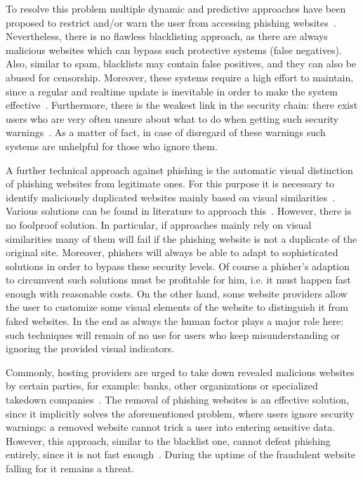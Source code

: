 \begin{description}[leftmargin=0cm]
 To resolve this problem multiple dynamic and predictive approaches have been proposed to restrict and/or warn the user from accessing phishing websites~\cite{prakash2010phishnet, obied2009fraudulent, balzarotti2012proactive}. Nevertheless, there is no flawless blacklisting approach, as there are always malicious websites which can bypass such protective systems (false negatives). Also, similar to spam, blacklists may contain false positives, and they can also be abused for censorship.
 Moreover, these systems require a high effort to maintain, since a regular and realtime update is inevitable in order to make the system effective~\cite{purkait2012phishing}. Furthermore, there is the weakest link in the security chain: there exist users who are very often unsure about what to do when getting such security warnings~\cite{bakhshi2009social}. As a matter of fact, in case of disregard of these warnings such systems are unhelpful for those who ignore them. 
	\item[Visual distinction] A further technical approach against phishing is the automatic visual distinction of phishing websites from legitimate ones.
 For this purpose it is necessary to identify maliciously duplicated websites mainly based on visual similarities~\cite{liu2006antiphishing}. Various solutions can be found in literature to approach this~\cite{chen2009fighting,chen2010detecting,zhang2011textual}. However, there is no foolproof solution.
 In particular, if approaches mainly rely on visual similarities many of them will fail if the phishing website is not a duplicate of the original site.
 Moreover, phishers will always be able to adapt to sophisticated solutions in order to bypass these security levels. 
Of course a phisher's adaption to circumvent such solutions must be profitable for him, i.e. it must happen fast enough with reasonable costs.
On the other hand, some website providers allow the user to customize some visual elements of the website to distinguish it from faked websites.
In the end as always the human factor plays a major role here: such techniques will remain of no use for users who keep misunderstanding or ignoring the provided visual indicators.

	\item[Takedown] Commonly, hosting providers are urged to take down revealed malicious websites by certain parties, for example: banks, other organizations or specialized takedown companies~\cite{moore2007examining}. The removal of phishing websites is an effective solution, since it implicitly solves the aforementioned problem, where users ignore security warnings: a removed website cannot trick a user into entering sensitive data.
 However, this approach, similar to the blacklist one, cannot defeat phishing entirely, since it is not fast enough~\cite{moore2007examining}. During the uptime of the fraudulent website falling for it remains a threat.

\end{description}

